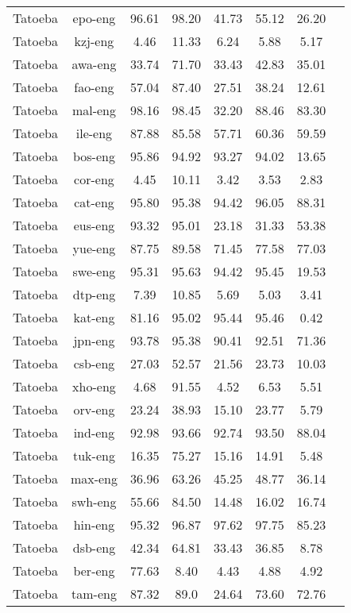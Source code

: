 \documentclass[11pt]{article}
\begin{document}
\begin{table*}[t!]
{\begin{tabular}{lc|cccccc}
Tatoeba & epo-eng & 96.61 & 98.20 & 41.73 & 55.12 & 26.20 \\
Tatoeba & kzj-eng & 4.46 & 11.33 & 6.24 & 5.88 & 5.17 \\
Tatoeba & awa-eng & 33.74 & 71.70 & 33.43 & 42.83 & 35.01 \\
Tatoeba & fao-eng & 57.04 & 87.40 & 27.51 & 38.24 & 12.61 \\
Tatoeba & mal-eng & 98.16 & 98.45 & 32.20 & 88.46 & 83.30 \\
Tatoeba & ile-eng & 87.88 & 85.58 & 57.71 & 60.36 & 59.59 \\
Tatoeba & bos-eng & 95.86 & 94.92 & 93.27 & 94.02 & 13.65 \\
Tatoeba & cor-eng & 4.45 & 10.11 & 3.42 & 3.53 & 2.83 \\
Tatoeba & cat-eng & 95.80 & 95.38 & 94.42 & 96.05 & 88.31 \\
Tatoeba & eus-eng & 93.32 & 95.01 & 23.18 & 31.33 & 53.38 \\
Tatoeba & yue-eng & 87.75 & 89.58 & 71.45 & 77.58 & 77.03 \\
Tatoeba & swe-eng & 95.31 & 95.63 & 94.42 & 95.45 & 19.53 \\
Tatoeba & dtp-eng & 7.39 & 10.85 & 5.69 & 5.03 & 3.41 \\
Tatoeba & kat-eng & 81.16 & 95.02 & 95.44 & 95.46 & 0.42 \\
Tatoeba & jpn-eng & 93.78 & 95.38 & 90.41 & 92.51 & 71.36 \\
Tatoeba & csb-eng & 27.03 & 52.57 & 21.56 & 23.73 & 10.03 \\
Tatoeba & xho-eng & 4.68 & 91.55 & 4.52 & 6.53 & 5.51 \\
Tatoeba & orv-eng & 23.24 & 38.93 & 15.10 & 23.77 & 5.79 \\
Tatoeba & ind-eng & 92.98 & 93.66 & 92.74 & 93.50 & 88.04 \\
Tatoeba & tuk-eng & 16.35 & 75.27 & 15.16 & 14.91 & 5.48 \\
Tatoeba & max-eng & 36.96 & 63.26 & 45.25 & 48.77 & 36.14 \\
Tatoeba & swh-eng & 55.66 & 84.50 & 14.48 & 16.02 & 16.74 \\
Tatoeba & hin-eng & 95.32 & 96.87 & 97.62 & 97.75 & 85.23 \\
Tatoeba & dsb-eng & 42.34 & 64.81 & 33.43 & 36.85 & 8.78 \\
Tatoeba & ber-eng & 77.63 & 8.40 & 4.43 & 4.88 & 4.92 \\
Tatoeba & tam-eng & 87.32 & 89.0 & 24.64 & 73.60 & 72.76 \\

\end{tabular}}
\end{table*}
\end{document}
